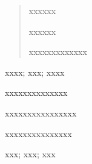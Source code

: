 \begin{abstract}
xxxxxx

xxxxxx

xxxxxxxxxxxxx

\end{abstract}

\begin{keywords}
xxxx;  xxx;  xxxx 

\end{keywords}

\cleardoublepage

\begin{englishabstract}
xxxxxxxxxxxxxx

xxxxxxxxxxxxxxxx

xxxxxxxxxxxxxxx
\end{englishabstract}

\begin{englishkeywords}
xxx; xxx; xxx
\end{englishkeywords} 

\cleardoublepage